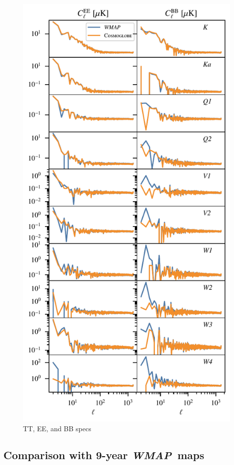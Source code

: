 \documentclass[twocolumn]{../../common/aa}
\def\WMAP{\emph{WMAP}}
\begin{document}
\begin{figure}
	\includegraphics{figures/EE_BB_spec.pdf}
	\caption{TT, EE, and BB specs}
	\label{fig:map_spectra}
\end{figure}


\subsection{Comparison with 9-year \WMAP\ maps}
\label{sec:wmap_comparison}
\end{document}
